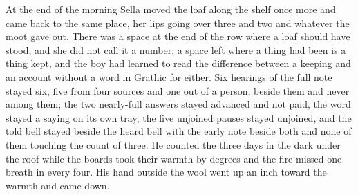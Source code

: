 At the end of the morning Sella moved the loaf along the shelf once more and came back to the same place, her lips going over three and two and whatever the moot gave out. There was a space at the end of the row where a loaf should have stood, and she did not call it a number; a space left where a thing had been is a thing kept, and the boy had learned to read the difference between a keeping and an account without a word in Grathic for either. Six hearings of the full note stayed six, five from four sources and one out of a person, beside them and never among them; the two nearly-full answers stayed advanced and not paid, the word stayed a saying on its own tray, the five unjoined pauses stayed unjoined, and the told bell stayed beside the heard bell with the early note beside both and none of them touching the count of three. He counted the three days in the dark under the roof while the boards took their warmth by degrees and the fire missed one breath in every four. His hand outside the wool went up an inch toward the warmth and came down.
